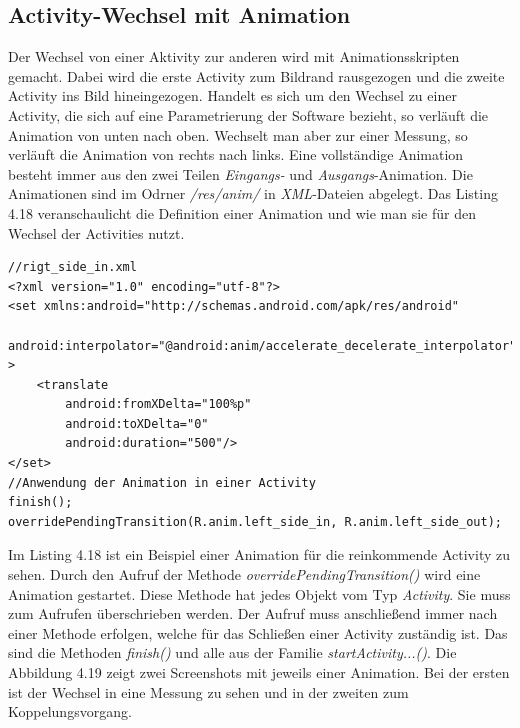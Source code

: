 \subsection{Activity-Wechsel mit Animation}

Der Wechsel von einer Aktivity zur anderen wird mit Animationsskripten gemacht.
Dabei wird die erste Activity zum Bildrand rausgezogen und die zweite Activity ins Bild hineingezogen.
Handelt es sich um den Wechsel zu einer Activity, die sich auf eine Parametrierung der Software bezieht, 
so verl\"auft die Animation von unten nach oben.
Wechselt man aber zur einer Messung, so verl\"auft die Animation von rechts nach links.
Eine vollst\"andige Animation besteht immer aus den zwei Teilen \emph{Eingangs-} und \emph{Ausgangs}-Animation.
Die Animationen sind im Odrner \emph{/res/anim/} in \emph{XML}-Dateien abgelegt.
Das Listing 4.18 veranschaulicht die Definition einer Animation und wie man sie f\"ur den Wechsel der Activities nutzt.\\

\begin{lstlisting}[caption={Animation zum Verlassen einer Activity}]
//rigt_side_in.xml
<?xml version="1.0" encoding="utf-8"?>
<set xmlns:android="http://schemas.android.com/apk/res/android" 
    android:interpolator="@android:anim/accelerate_decelerate_interpolator" >    
    <translate
        android:fromXDelta="100%p"
        android:toXDelta="0"
        android:duration="500"/>    
</set>
//Anwendung der Animation in einer Activity
finish();
overridePendingTransition(R.anim.left_side_in, R.anim.left_side_out);
\end{lstlisting}

Im Listing 4.18 ist ein Beispiel einer Animation f\"ur die reinkommende Activity zu sehen.
Durch den Aufruf der Methode \emph{overridePendingTransition()} wird eine Animation gestartet.
Diese Methode hat jedes Objekt vom Typ \emph{Activity}.
Sie muss zum Aufrufen \"uberschrieben werden.
Der Aufruf muss anschlie\ss{}end immer nach einer Methode erfolgen, welche f\"ur das Schlie\ss{}en einer Activity zust\"andig ist.
Das sind die Methoden \emph{finish()} und alle aus der Familie \emph{startActivity...()}.
Die Abbildung 4.19 zeigt zwei Screenshots mit jeweils einer Animation.
Bei der ersten ist der Wechsel in eine Messung zu sehen und in der zweiten zum Koppelungsvorgang.\\


